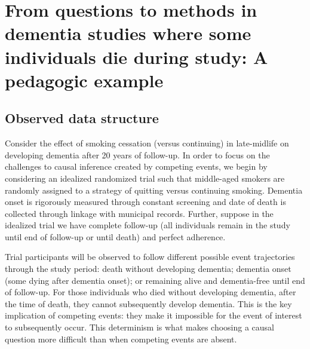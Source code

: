 \documentclass[
]{book}
\begin{document}
\hypertarget{from-questions-to-methods-in-dementia-studies-where-some-individuals-die-during-study-a-pedagogic-example}{%
\section{From questions to methods in dementia studies where some individuals die during study: A pedagogic example}\label{from-questions-to-methods-in-dementia-studies-where-some-individuals-die-during-study-a-pedagogic-example}}

\hypertarget{observed-data-structure}{%
\subsection{Observed data structure}\label{observed-data-structure}}

Consider the effect of smoking cessation (versus continuing) in late-midlife on developing dementia after 20 years of follow-up. In order to focus on the challenges to causal inference created by competing events, we begin by considering an idealized randomized trial such that middle-aged smokers are randomly assigned to a strategy of quitting versus continuing smoking. Dementia onset is rigorously measured through constant screening and date of death is collected through linkage with municipal records. Further, suppose in the idealized trial we have complete follow-up (all individuals remain in the study until end of follow-up or until death) and perfect adherence.

Trial participants will be observed to follow different possible event trajectories through the study period: death without developing dementia; dementia onset (some dying after dementia onset); or remaining alive and dementia-free until end of follow-up. For those individuals who died without developing dementia, after the time of death, they cannot subsequently develop dementia. This is the key implication of competing events: they make it impossible for the event of interest to subsequently occur. This determinism is what makes choosing a causal question more difficult than when competing events are absent.
\end{document}
